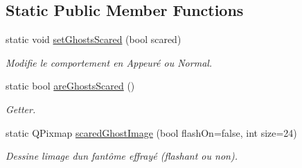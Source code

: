 \subsection*{Static Public Member Functions}
\begin{DoxyCompactItemize}
\item 
static void \hyperlink{class_ghost_adb0d9cf00e0918c43abeb4c1bfc116ec}{set\+Ghosts\+Scared} (bool scared)
\begin{DoxyCompactList}\small\item\em Modifie le comportement en Appeuré ou Normal. \end{DoxyCompactList}\item 
static bool \hyperlink{class_ghost_a09869588955cc6014359262e4f199300}{are\+Ghosts\+Scared} ()
\begin{DoxyCompactList}\small\item\em Getter. \end{DoxyCompactList}\item 
static Q\+Pixmap \hyperlink{class_ghost_a89c202713c5640f09a3cffc73b40d38a}{scared\+Ghost\+Image} (bool flash\+On=false, int size=24)
\begin{DoxyCompactList}\small\item\em Dessine l\textquotesingle{}image d\textquotesingle{}un fantôme effrayé (flashant ou non). \end{DoxyCompactList}\end{DoxyCompactItemize}
